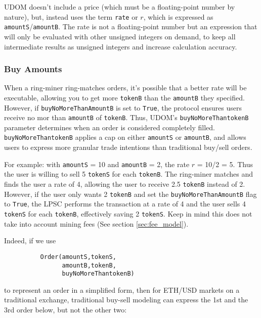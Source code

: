 \documentclass[UTF8,nofonts]{article}
\begin{document}
\begin{multicols}{2}
UDOM doesn't include a price (which must be a floating-point number by nature), but, instead uses the term \verb|rate| or $r$, which is expressed as \verb|amountS|/\verb|amountB|. The rate is not a floating-point number but an expression that will only be evaluated with other unsigned integers on demand, to keep all intermediate results as unsigned integers and increase calculation accuracy. 

\subsubsection{Buy Amounts}

When a ring-miner ring-matches orders, it's possible that a better rate will be executable, allowing you to get more \verb|tokenB| than the \verb|amountB| they specified. However, if \verb|buyNoMoreThanAmountB| is set to \verb|True|, the protocol ensures users receive no mor than \verb|amountB| of \verb|tokenB|. Thus, UDOM's \verb|buyNoMoreThantokenB| parameter determines when an order is considered completely filled. \verb|buyNoMoreThantokenB| applies a cap on either \verb|amountS| or \verb|amountB|, and allows users to express more granular trade intentions than traditional buy/sell orders.

For example: with \verb|amountS| = 10 and \verb|amountB| = 2, the rate $r$ = 10/2 = 5. Thus the user is willing to sell 5 \verb|tokenS| for each \verb|tokenB|. The ring-miner matches and finds the user a rate of 4, allowing the user to receive 2.5 \verb|tokenB| instead of 2. However, if the user only wants 2 \verb|tokenB| and set the \verb|buyNoMoreThanAmountB| flag to \verb|True|, the LPSC performs the transaction at a rate of 4 and the user sells 4 \verb|tokenS| for each \verb|tokenB|, effectively saving 2 \verb|tokenS|. Keep in mind this does not take into account mining fees (See section \ref{sec:fee_model}).

Indeed, if we use


\begin{verbatim}
	      Order(amountS,tokenS,
	            amountB,tokenB,
	            buyNoMoreThantokenB)
\end{verbatim}

to represent an order in a simplified form, then for ETH/USD markets on a traditional exchange, traditional buy-sell modeling can express the 1st and the 3rd order below, but not the other two:


\end{multicols}
\end{document}
